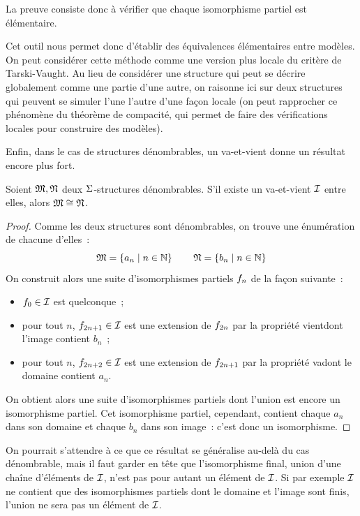 \begin{remark}
  La preuve consiste donc à vérifier que chaque isomorphisme partiel est
  élémentaire.
\end{remark}

Cet outil nous permet donc d'établir des équivalences élémentaires entre
modèles. On peut considérer cette méthode comme une version plus locale du
critère de Tarski-Vaught. Au lieu de considérer une structure qui peut se
décrire globalement comme une partie d'une autre, on raisonne ici sur deux
structures qui peuvent se simuler l'une l'autre d'une façon locale (on peut
rapprocher ce phénomène du théorème de compacité, qui permet de faire des
vérifications locales pour construire des modèles).

Enfin, dans le cas de structures dénombrables, un va-et-vient donne un résultat
encore plus fort.

\begin{lemma}
  Soient $\mathfrak{M},\mathfrak{N}$ deux $\Sigma$-structures dénombrables. S'il existe
  un va-et-vient $\mathcal{I}$ entre elles, alors $\mathfrak{M}\cong\mathfrak{N}$.
\end{lemma}

\begin{proof}
  Comme les deux structures sont dénombrables, on trouve une énumération de
  chacune d'elles~:
  \[\mathfrak{M} = \left\{ a_n \;\middle\vert\; n\in\mathbb N \right\} \qquad
  \mathfrak{N} = \left\{ b_n \;\middle\vert\; n\in\mathbb N \right\}\]
  On construit alors une suite d'isomorphismes partiels $f_n$ de la
  façon suivante~:
  \begin{itemize}
  \item $f_0\in\mathcal{I}$ est quelconque~;
  \item pour tout $n$, $f_{2n+1}\in\mathcal{I}$ est une extension de
    $f_{2n}$ par la propriété \og vient\fg dont l'image contient $b_n$~;
  \item pour tout $n$, $f_{2n+2}\in\mathcal{I}$ est une extension de
    $f_{2n+1}$ par la propriété \og va\fg dont le domaine contient $a_n$.
  \end{itemize}
  On obtient alors une suite d'isomorphismes partiels dont l'union est encore
  un isomorphisme partiel. Cet isomorphisme partiel, cependant, contient
  chaque $a_n$ dans son domaine et chaque $b_n$ dans son image~: c'est donc
  un isomorphisme.
\end{proof}

\begin{remark}
  On pourrait s'attendre à ce que ce résultat se généralise au-delà du cas
  dénombrable, mais il faut garder en tête que l'isomorphisme final, union d'une
  chaîne d'éléments de $\mathcal{I}$, n'est pas pour autant un élément de $\mathcal{I}$.
  Si par exemple $\mathcal{I}$ ne contient que des isomorphismes partiels dont le
  domaine et l'image sont finis, l'union ne sera pas un élément de $\mathcal{I}$.
\end{remark}

